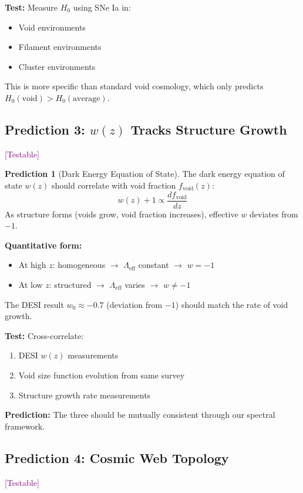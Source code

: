 \documentclass[11pt,a4paper]{article}
\theoremstyle{plain}
\theoremstyle{definition}
\newtheorem{prediction}[theorem]{Prediction}
\theoremstyle{remark}
\newcommand{\testable}{\textcolor{purple}{[Testable]}}
\begin{document}
\textbf{Test:} Measure $H_0$ using SNe Ia in:
\begin{itemize}[noitemsep]
    \item Void environments
    \item Filament environments
    \item Cluster environments
\end{itemize}

This is more specific than standard void cosmology, which only predicts $H_0(\text{void}) > H_0(\text{average})$.

\subsection{Prediction 3: $w(z)$ Tracks Structure Growth} \testable

\begin{prediction}[Dark Energy Equation of State]
The dark energy equation of state $w(z)$ should correlate with void fraction $f_{\text{void}}(z)$:
\[
w(z) + 1 \propto \frac{df_{\text{void}}}{dz}
\]
As structure forms (voids grow, void fraction increases), effective $w$ deviates from $-1$.
\end{prediction}

\textbf{Quantitative form:}
\begin{itemize}[noitemsep]
    \item At high $z$: homogeneous $\to$ $\Lambda_{\text{eff}}$ constant $\to$ $w = -1$
    \item At low $z$: structured $\to$ $\Lambda_{\text{eff}}$ varies $\to$ $w \neq -1$
\end{itemize}

The DESI result $w_0 \approx -0.7$ (deviation from $-1$) should match the rate of void growth.

\textbf{Test:} Cross-correlate:
\begin{enumerate}[noitemsep]
    \item DESI $w(z)$ measurements
    \item Void size function evolution from same survey
    \item Structure growth rate measurements
\end{enumerate}

\textbf{Prediction:} The three should be mutually consistent through our spectral framework.

\subsection{Prediction 4: Cosmic Web Topology} \testable
\end{document}
